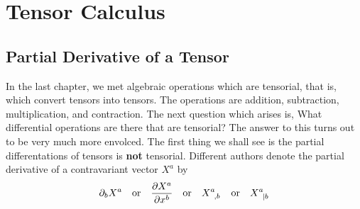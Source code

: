 \chapter{Tensor Calculus}\label{cap:6}
\section{Partial Derivative of a Tensor}\label{sec:6.1}
In the last chapter, we met algebraic operations which are tensorial, that is, which convert tensors into tensors. The operations are addition, subtraction, multiplication, and contraction. The next question which arises is, What differential operations are there that are tensorial? The answer to this turns out to be very much more envolced. The first thing we shall see is the partial differentations of tensors is \textbf{not} tensorial. Different authors denote the partial derivative of a contravariant vector $X^{a}$ by $$\partial_bX^{a}\quad \mbox{or} \quad \pdv{X^{a}}{x^b}\quad\mbox{or}\quad \tensor{X}{^{a}_{,b}} \quad \mbox{or}\quad \tensor{X}{^{a}_{|b}}$$
